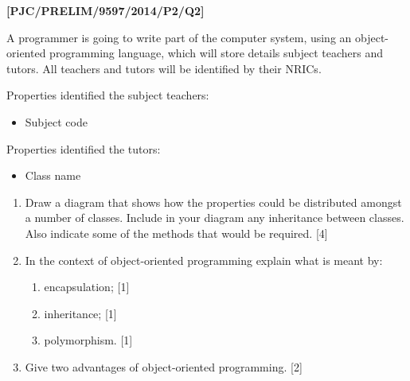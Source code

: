\item \textbf{{[}PJC/PRELIM/9597/2014/P2/Q2{]} }

A programmer is going to write part of the computer system, using
an object-oriented programming language, which will store details
subject teachers and tutors. All teachers and tutors will be identified
by their NRICs. 

Properties identified the subject teachers: 
\begin{itemize}
\item Subject code 
\end{itemize}
Properties identified the tutors: 
\begin{itemize}
\item Class name 
\end{itemize}
\begin{enumerate}
\item Draw a diagram that shows how the properties could be distributed
amongst a number of classes. Include in your diagram any inheritance
between classes. Also indicate some of the methods that would be required.
\hfill{}{[}4{]}
\item In the context of object-oriented programming explain what is meant
by:
\begin{enumerate}
\item encapsulation; \hfill{}{[}1{]}
\item inheritance;\hfill{} {[}1{]}
\item polymorphism. \hfill{}{[}1{]}
\end{enumerate}
\item Give two advantages of object-oriented programming. \hfill{}{[}2{]}
\end{enumerate}